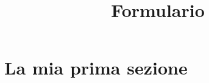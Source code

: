 \documentclass{article}
\title{Formulario}
\begin{document}
\maketitle

\section{La mia prima sezione}
\end{document}

